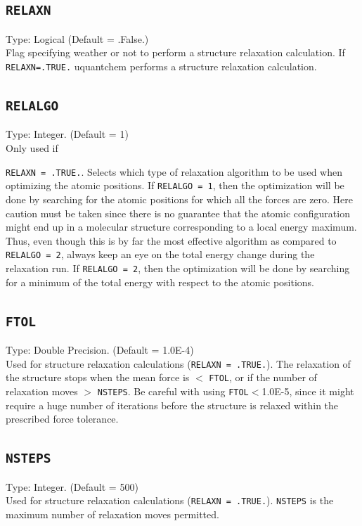 \documentclass[a4paper,twoside,openany]{book}
\begin{document}
\subsection{\texttt{RELAXN}}
Type: Logical (Default = .False.)\\
Flag specifying weather or not to perform a structure relaxation calculation. If \texttt{RELAXN=.TRUE.} uquantchem performs a structure relaxation calculation.

\subsection{\texttt{RELALGO}}
Type: Integer. (Default = 1)\\
Only used if {\texttt{RELAXN = .TRUE.}. Selects which type of relaxation algorithm to be used when optimizing the atomic positions. If \texttt{RELALGO = 1}, then the optimization 
will be done by searching for the atomic positions for which all the forces are zero. Here caution must be taken since there is no guarantee that the atomic configuration might end 
up in a molecular structure corresponding to a local energy maximum. Thus, even though this is by far the most effective algorithm as compared to \texttt{RELALGO = 2}, always keep 
an eye on the total energy change during the relaxation run. If \texttt{RELALGO = 2}, then the optimization will be done by searching for a minimum of the total energy
with respect to the atomic positions.

\subsection{\texttt{FTOL}}
Type: Double Precision. (Default = 1.0E-4)\\
Used for structure relaxation calculations (\texttt{RELAXN = .TRUE.}). The relaxation of the structure stops when the mean force is   $<$ \texttt{FTOL}, or if the number of relaxation 
moves $>$ \texttt{NSTEPS}. Be careful with using  \texttt{FTOL}$<$1.0E-5, since it might require a huge number of iterations before the structure is relaxed within the prescribed force tolerance.

\subsection{\texttt{NSTEPS}}
Type: Integer. (Default = 500)\\
Used for structure relaxation calculations (\texttt{RELAXN = .TRUE.}). \texttt{NSTEPS} is the maximum number of relaxation moves permitted. 

}
\end{document}
